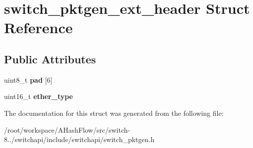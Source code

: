 \hypertarget{structswitch__pktgen__ext__header}{\section{switch\+\_\+pktgen\+\_\+ext\+\_\+header Struct Reference}
\label{structswitch__pktgen__ext__header}
}
\subsection*{Public Attributes}
\begin{DoxyCompactItemize}
\item 
\hypertarget{structswitch__pktgen__ext__header_abbb2687381a641b9f6eeba64e5788f71}{uint8\+\_\+t {\bfseries pad} \mbox{[}6\mbox{]}}\label{structswitch__pktgen__ext__header_abbb2687381a641b9f6eeba64e5788f71}

\item 
\hypertarget{structswitch__pktgen__ext__header_aee1459e9952a2d000a0d2a448b0049d9}{uint16\+\_\+t {\bfseries ether\+\_\+type}}\label{structswitch__pktgen__ext__header_aee1459e9952a2d000a0d2a448b0049d9}

\end{DoxyCompactItemize}


The documentation for this struct was generated from the following file\+:\begin{DoxyCompactItemize}
\item 
/root/workspace/\+A\+Hash\+Flow/src/switch-\/8../switchapi/include/switchapi/switch\+\_\+pktgen.\+h\end{DoxyCompactItemize}
